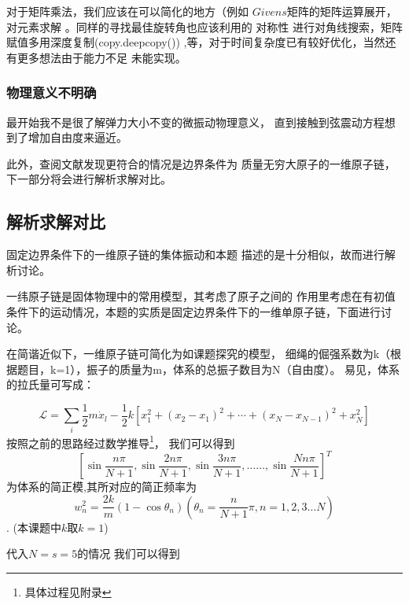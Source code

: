 \documentclass[11pt, a4paper, oneside]{ctexart}
\begin{document}
{{{对于矩阵乘法，我们应该在可以简化的地方（例如
$Givens$矩阵的矩阵运算展开，对元素求解
。同样的寻找最佳旋转角也应该利用的
对称性
进行对角线搜索，矩阵赋值多用深度复制(copy.deepcopy())
,等，对于时间复杂度已有较好优化，当然还有更多想法由于能力不足
未能实现。

\subsubsection{物理意义不明确}

最开始我不是很了解弹力大小不变的微振动物理意义，
直到接触到弦震动方程想到了增加自由度来逼近。

此外，查阅文献发现更符合的情况是边界条件为
质量无穷大原子的一维原子链，下一部分将会进行解析求解对比。

    }
\subsection{解析求解对比}
{
    固定边界条件下的一维原子链的集体振动和本题
    描述的是十分相似，故而进行解析讨论。

    一纬原子链是固体物理中的常用模型，其考虑了原子之间的
    作用里考虑在有初值条件下的运动情况，本题的实质是固定边界条件下的一维单原子链，下面进行讨论。

    在简谐近似下，一维原子链可简化为如课题探究的模型，
    细绳的倔强系数为k（根据题目，k=1），振子的质量为m，体系的总振子数目为N（自由度）。
易见，\cite{g}体系的拉氏量可写成：

\begin{equation}
    \mathscr{L}=\sum_{i} \frac{1}{2} m \dot{x}_{l}-\frac{1}{2} k\left[x_{1}^{2}+\left(x_{2}-x_{1}\right)^{2}+\cdots+\left(x_{N}-x_{N-1}\right)^{2}+x_{N}^{2}\right]
    \end{equation}
按照之前的思路经过数学推导\footnote{具体过程见附录}，
我们可以得到
$$\left[\sin \frac{n \pi}{N+1}, \sin \frac{2 n \pi}{N+1}, \sin \frac{3 n \pi}{N+1}, \ldots \ldots, \sin \frac{N n \pi}{N+1}\right]^{T}$$ 
为体系的简正模,其所对应的简正频率为
 $$w_{n}^{2}=\frac{2 k}{m}\left(1-\cos \theta_{n}\right)\left(\theta_{n}=\frac{n}{N+1} \pi, n=1,2,3 \ldots N\right)$$.
(本课题中$k$取$k=1$)

代入$N=s=5$的情况
我们可以得到


}}}
\end{document}
